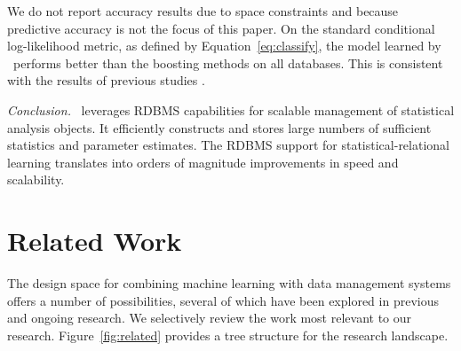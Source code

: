 \documentclass{IEEEtran}
\begin{document}
We do not report accuracy results due to space constraints and because predictive accuracy is not the focus of this paper. On the standard conditional log-likelihood metric, as defined by Equation~\ref{eq:classify}, the model learned by \FB\ performs better than the boosting methods on all databases. This is consistent with the results of previous studies \cite{Schulte2012}.

\begin{table}[htbp] \caption{Learning Time Comparison (sec) with other statistical-relational learning systems. NT = non-termination}
  \centering
  \label{tab:othersrl}%
\end{table}%

{\em Conclusion.} \FB\ leverages RDBMS capabilities for scalable management of statistical analysis objects. It efficiently constructs and stores large numbers of sufficient statistics and parameter estimates. 
The RDBMS support for statistical-relational learning translates into orders of magnitude improvements in speed and scalability.


\section{Related Work} \label{sec:related}

The design space for combining machine learning with data management systems offers a number of possibilities, several of which have been explored in previous and ongoing research. 
We selectively review the work most relevant to our research. Figure~\ref{fig:related} provides a tree structure for the research landscape. 
\end{document}

